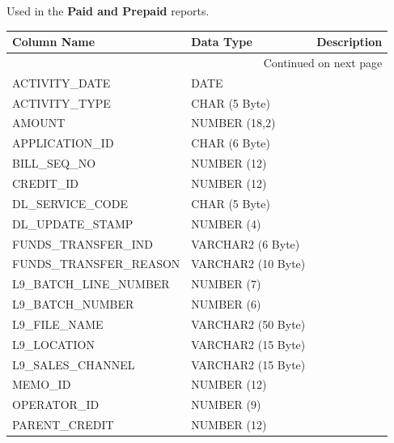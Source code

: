 \documentclass[12pt,twoside]{article}
\begin{document}
    Used in the \textbf{Paid and Prepaid} reports.
\scriptsize
\begin{longtable}{lll}

\hline
 \textbf{Column Name}     &  \textbf{Data Type}  &  \textbf{Description} \\
\hline
\endhead
\hline\multicolumn{3}{r}{Continued on next page}\
\endfoot
\endlastfoot
 ACCOUNT\_ID              &  NUMBER (12)         &                        \\
 ACTIVITY\_DATE           &  DATE                &                        \\
 ACTIVITY\_TYPE           &  CHAR (5 Byte)       &                        \\
 AMOUNT                   &  NUMBER (18,2)       &                        \\
 APPLICATION\_ID          &  CHAR (6 Byte)       &                        \\
 BILL\_SEQ\_NO            &  NUMBER (12)         &                        \\
 CREDIT\_ID               &  NUMBER (12)         &                        \\
 DL\_SERVICE\_CODE        &  CHAR (5 Byte)       &                        \\
 DL\_UPDATE\_STAMP        &  NUMBER (4)          &                        \\
 FUNDS\_TRANSFER\_IND     &  VARCHAR2 (6 Byte)   &                        \\
 FUNDS\_TRANSFER\_REASON  &  VARCHAR2 (10 Byte)  &                        \\
 L9\_BATCH\_LINE\_NUMBER  &  NUMBER (7)          &                        \\
 L9\_BATCH\_NUMBER        &  NUMBER (6)          &                        \\
 L9\_FILE\_NAME           &  VARCHAR2 (50 Byte)  &                        \\
 L9\_LOCATION             &  VARCHAR2 (15 Byte)  &                        \\
 L9\_SALES\_CHANNEL       &  VARCHAR2 (15 Byte)  &                        \\
 MEMO\_ID                 &  NUMBER (12)         &                        \\
 OPERATOR\_ID             &  NUMBER (9)          &                        \\
 PARENT\_CREDIT           &  NUMBER (12)         &                        \\

\end{longtable}
\end{document}
